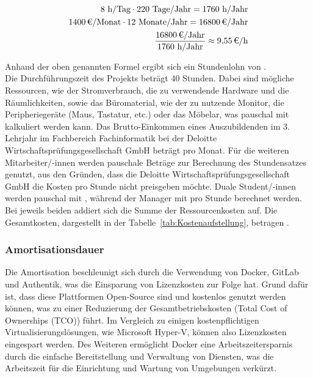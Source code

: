 \begin{eqnarray}
	8 \mbox{ h/Tag} \cdot 220 \mbox{ Tage/Jahr} = 1760 \mbox{ h/Jahr}\\
	\eur{1400}\mbox{/Monat} \cdot 12 \mbox{ Monate/Jahr} = \eur{16800} \mbox{/Jahr}\\
	\frac{\eur{16800} \mbox{/Jahr}}{1760 \mbox{ h/Jahr}} \approx \eur{9,55}\mbox{/h}
\end{eqnarray}

Anhand der oben genannten Formel ergibt sich ein Stundenlohn von . 
\\Die Durchführungszeit des Projekts beträgt 40 Stunden. 
Dabei sind mögliche Ressourcen, wie der Stromverbrauch, die zu verwendende Hardware und die Räumlichkeiten, sowie das Büromaterial, 
wie \zB der zu nutzende Monitor, die Peripheriegeräte (Maus, Tastatur, etc.) oder das Möbelar, was pauschal mit  kalkuliert werden kann. 
Das Brutto-Einkommen eines Auszubildenden im 3. Lehrjahr im Fachbereich Fachinformatik bei der Deloitte Wirtschaftsprüfungsgesellschaft GmbH 
beträgt  pro Monat. 
Für die weiteren Mitarbeiter/-innen werden pauschale Beträge zur Berechnung des Stundensatzes genutzt, aus den Gründen, dass die 
Deloitte Wirtschaftsprüfungsgesellschaft GmbH die Kosten pro Stunde nicht preisgeben möchte. Duale Student/-innen werden pauschal mit 
, während der Manager mit  pro Stunde berechnet werden. Bei jeweils beiden addiert sich die Summe der 
Ressourcenkosten auf. Die Gesamtkosten, dargestellt in der Tabelle~\ref{tab:Kostenaufstellung}, betragen .


\subsubsection{Amortisationsdauer}
\label{sec:Amortisationsdauer}
Die Amortisation beschleunigt sich durch die Verwendung von Docker, GitLab und Authentik, was die Einsparung von Lizenzkosten zur Folge hat. 
Grund dafür ist, dass diese Plattformen Open-Source sind und kostenlos genutzt werden können, was zu einer Reduzierung der  
Gesamtbetriebskosten (Total Cost of Ownerships (TCO)) führt. 
Im Vergleich zu einigen kostenpflichtigen Virtualisierungslösungen, wie \zB Microsoft Hyper-V, können also Lizenzkosten eingespart werden. 
Des Weiteren ermöglicht Docker eine Arbeitszeitersparnis durch die einfache Bereitstellung und Verwaltung von Diensten, was die Arbeitszeit für die 
Einrichtung und Wartung von Umgebungen verkürzt.


